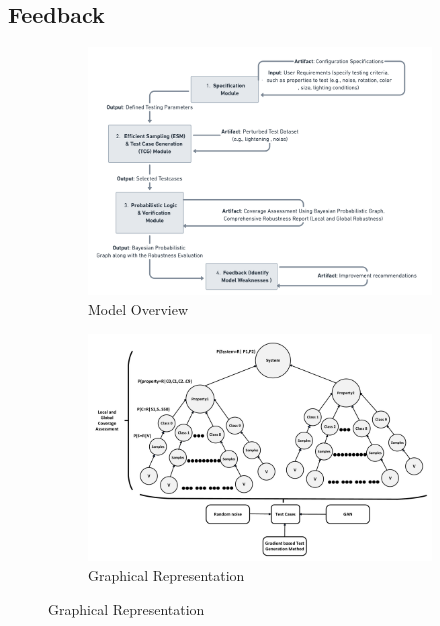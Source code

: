 \documentclass[10pt, conference, a4paper, final]{IEEEtran}
\begin{document}
\subsection {Feedback}
\begin{figure}[H]
    \centering
    \begin{subfigure}{.5\textwidth}
        \centering
        \includegraphics[width=\linewidth]{paper_images/overview.png}
        \caption{Model Overview}
        \label{fig:overview}
    \end{subfigure}%
    \begin{subfigure}{.5\textwidth}
        \centering
        \includegraphics[width=\linewidth]{paper_images/graph.pdf}
        \caption{Graphical Representation}
        \label{fig:graph}
    \end{subfigure}
\end{figure}
\end{document}
